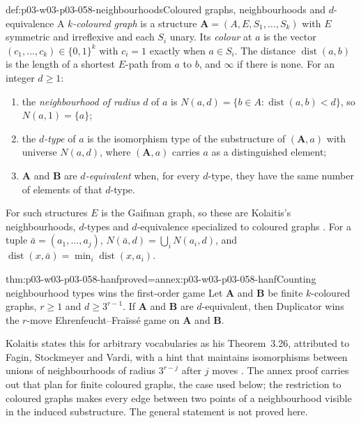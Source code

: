 \begin{hbdefinition}{def:p03-w03-p03-058-neighbourhoods}{Coloured graphs, neighbourhoods and \(d\)-equivalence}
A \emph{\(k\)-coloured graph} is a structure
\(\mathbf A=(A,E,S_1,\ldots,S_k)\) with \(E\) symmetric and irreflexive and
each \(S_i\) unary. Its \emph{colour} at \(a\) is the vector
\((c_1,\ldots,c_k)\in\{0,1\}^k\) with \(c_i=1\) exactly when \(a\in S_i\).
The distance \(\operatorname{dist}(a,b)\) is the length of a shortest
\(E\)-path from \(a\) to \(b\), and \(\infty\) if there is none. For an
integer \(d\ge1\):
\begin{enumerate}
\item the \emph{neighbourhood of radius \(d\)} of \(a\) is
      \(N(a,d)=\{b\in A:\operatorname{dist}(a,b)<d\}\), so
      \(N(a,1)=\{a\}\);
\item the \emph{\(d\)-type} of \(a\) is the isomorphism type of the
      substructure of \((\mathbf A,a)\) with universe \(N(a,d)\), where
      \((\mathbf A,a)\) carries \(a\) as a distinguished element;
\item \(\mathbf A\) and \(\mathbf B\) are \emph{\(d\)-equivalent} when, for
      every \(d\)-type, they have the same number of elements of that
      \(d\)-type.
\end{enumerate}
For such structures \(E\) is the Gaifman graph, so these are Kolaitis's
neighbourhoods, \(d\)-types and \(d\)-equivalence specialized to coloured
graphs \cite[Defs.~3.22, 3.24 and~3.25, pp.~18--19]{Kolaitis2003ExpressivePowerNotes}.
For a tuple \(\bar a=(a_1,\ldots,a_j)\),
\(N(\bar a,d)=\bigcup_iN(a_i,d)\), and
\(\operatorname{dist}(x,\bar a)=\min_i\operatorname{dist}(x,a_i)\).
\end{hbdefinition}

\begin{hblemma}{thm:p03-w03-p03-058-hanf}{proved=annex:p03-w03-p03-058-hanf}{Counting neighbourhood types wins the first-order game}
Let \(\mathbf A\) and \(\mathbf B\) be finite \(k\)-coloured graphs, \(r\ge1\)
and \(d\ge3^{r-1}\). If \(\mathbf A\) and \(\mathbf B\) are
\(d\)-equivalent, then Duplicator wins the \(r\)-move
Ehrenfeucht--Fra\"iss\'e game on \(\mathbf A\) and \(\mathbf B\).
\end{hblemma}

Kolaitis states this for arbitrary vocabularies as his Theorem~3.26,
attributed to Fagin, Stockmeyer and Vardi, with a hint that maintains
isomorphisms between unions of neighbourhoods of radius \(3^{r-j}\) after
\(j\) moves \cite[Thm.~3.26, p.~19]{Kolaitis2003ExpressivePowerNotes}. The
annex proof carries out that plan for finite coloured graphs, the case used
below; the restriction to coloured graphs makes every edge between two
points of a neighbourhood visible in the induced substructure. The general
statement is not proved here.

